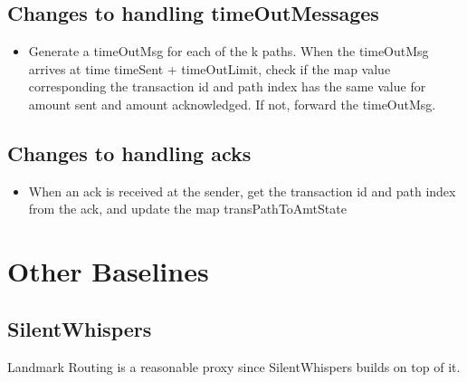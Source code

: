 \documentclass[a4paper]{article}
\begin{document}
\subsection{Changes to handling timeOutMessages}
\begin{itemize}
    \item Generate a timeOutMsg for each of the k paths. When the timeOutMsg arrives at time timeSent + timeOutLimit, check if the map value corresponding the transaction id and path index has the same value for amount sent and amount acknowledged. If not, forward the timeOutMsg.
\end{itemize}
\subsection{Changes to handling acks}
\begin{itemize}
    \item When an ack is received at the sender, get the transaction id and path index from the ack, and update the map transPathToAmtState
\end{itemize}

\section{Other Baselines}
\subsection{SilentWhispers}

Landmark Routing is a reasonable proxy since SilentWhispers builds on top of it. 
\end{document}
